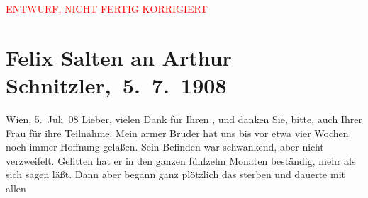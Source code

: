 
\begin{center}
            \textcolor{red}{ENTWURF, NICHT FERTIG KORRIGIERT}
                      \end{center}
            
         
         \renewcommand{\erwaehntePersonen}{Personen: Ottilie Salten, Michael Emil Salzmann, Marie Salzmann, Olga Schnitzler}
         \renewcommand{\erwaehnteOrte}{Orte: Bayreuth, Franzensbad, Noordwijk, Salzkammergut, Wien}
         \renewcommand{\erwaehnteWerke}{}
               \section[ Felix Salten an Arthur Schnitzler, 5. 7. 1908]{ Felix Salten an Arthur Schnitzler, 5. 7. 1908}\nopagebreak{}\rehead{ }\begin{ledgroupsized}[t]{13cm}\normalsize\beginnumbering \toendnotes[C]{\smallbreak\pagebreak[2]} 
\toendnotes[C]{\smallbreak}\pstart
           \raggedleft{}{\pb}Wien, 5. Juli 08\pend
           \pstart
           Lieber, vielen Dank für Ihren \label{K_L03497-1v}\label{K_L03497-1h}, und danken Sie, bitte, auch Ihrer \label{K_L03497-2v}\label{K_L03497-2h}{ }Frau für ihre Teilnahme. Mein
               armer Bruder hat uns bis vor
               etwa vier Wochen noch immer Hoffnung gelaßen. Sein Befinden war schwankend, aber
               nicht verzweifelt. Gelitten hat er in den ganzen fünfzehn Monaten beständig, mehr als
               sich sagen läßt. Dann aber begann ganz plötzlich das sterben und dauerte mit allen

\end{ledgroupsized}
